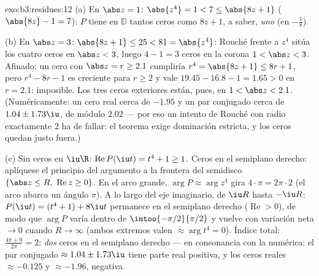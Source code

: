 \begin{solution}{exo:b3:residues:12}
(a) En $\abs z = 1$: $\abs{z^4} = 1 < 7 \leq \abs{8z + 1}$
($\abs{8z} - 1 = 7$): $P$ tiene en $\mathbb D$ tantos ceros como
$8z + 1$, a saber, \emph{uno} (en $-\frac18$).

(b) En $\abs z = 3$: $\abs{8z + 1} \leq 25 < 81 =
\abs{z^4}$: Rouché frente a $z^4$ sitúa los cuatro ceros en
$\abs z < 3$, luego $4 - 1 = 3$ ceros en la corona $1 <
\abs z < 3$. Afinado: un cero con $\abs z = r \geq 2.1$ cumpliría
$r^4 = \abs{8z + 1} \leq 8r + 1$, pero $r^4 -
8r - 1$ es creciente para $r \geq 2$ y vale $19.45 -
16.8 - 1 = 1.65 > 0$ en $r = 2.1$: imposible. Los tres ceros exteriores
están, pues, en $1 < \abs z < 2.1$. (Numéricamente: un cero real cerca
de $-1.95$ y un par conjugado cerca de $1.04 \pm
1.73\iu$, de módulo $2.02$ --- por eso un intento de Rouché con radio
exactamente $2$ ha de fallar: el teorema exige dominación estricta, y
los ceros quedan justo fuera.)

(c) Sin ceros en $\iu\R$: $\operatorname{Re}P(\iu t) = t^4 +
1 \geq 1$. Ceros en el semiplano derecho: aplíquese el principio del
argumento a la frontera del semidisco $\{\abs z \leq
R,\ \operatorname{Re}z \geq 0\}$. En el arco grande, $\arg P
\approx \arg z^4$ gira $4\cdot\pi = 2\pi\cdot2$ (el arco abarca un
ángulo $\pi$). A lo largo del eje imaginario, de $\iu R$ hasta $-\iu R$:
$P(\iu t) = (t^4 + 1) + 8\iu t$ permanece en el semiplano derecho
($\operatorname{Re} > 0$), de modo que $\arg P$ varía dentro de
$\intoo{-\pi/2}{\pi/2}$ y vuelve con variación neta $\to 0$ cuando
$R \to \infty$ (ambos extremos valen $\approx \arg t^4 = 0$). Índice
total: $\frac{4\pi + 0}
{2\pi} = 2$: \emph{dos} ceros en el semiplano derecho --- en consonancia
con la numérica: el par conjugado $\approx
1.04 \pm 1.73\iu$ tiene parte real positiva, y los ceros reales
$\approx -0.125$ y $\approx -1.96$, negativa.
\end{solution}

